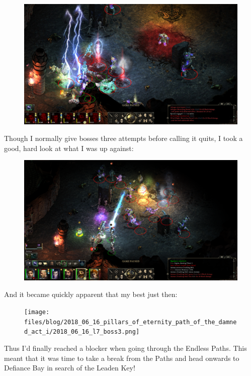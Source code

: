 \documentclass{article}
\begin{document}
\begin{figure}
\includegraphics[scale=0.33]{files/blog/2018_06_16_pillars_of_eternity_path_of_the_damned_act_i/2018_06_16_l7_boss1.jpg}
\end{figure}

Though I normally give bosses three attempts before calling it quits, I took a good, hard look at what I was up against:

\begin{figure}
\includegraphics[scale=0.33]{files/blog/2018_06_16_pillars_of_eternity_path_of_the_damned_act_i/2018_06_16_l7_boss2.png}
\end{figure}

And it became quickly apparent that my best just  then:

\begin{figure}
\texttt{[image: files/blog/2018\_06\_16\_pillars\_of\_eternity\_path\_of\_the\_damned\_act\_i/2018\_06\_16\_l7\_boss3.png]}
\end{figure}

Thus I'd finally reached a blocker when going through the Endless Paths.  This meant that it was time to take a break from the Paths and head onwards to Defiance Bay in search of the Leaden Key!
\end{document}
